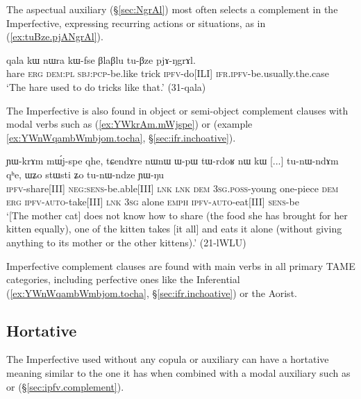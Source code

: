 The aspectual auxiliary  (§\ref{sec:NgrAl}) most often selects a complement in the Imperfective, expressing recurring actions or situations, as in (\ref{ex:tuBze.pjANgrAl}).

\begin{exe}
\ex \label{ex:tuBze.pjANgrAl}
\gll  qala kɯ nɯra kɯ-fse βlaβlu tu-βze pjɤ-ŋgrɤl. \\
hare \textsc{erg} \textsc{dem}:\textsc{pl} \textsc{sbj}:\textsc{pcp}-be.like trick \textsc{ipfv}-do[ILI] \textsc{ifr}.\textsc{ipfv}-be.usually.the.case \\
\glt `The hare used to do tricks like that.' (31-qala)
\end{exe}


The Imperfective is also found in object or semi-object complement clauses with modal verbs such as  (\ref{ex:YWkrAm.mWjspe}) or  (example \ref{ex:YWnWqambWmbjom.tocha}, §\ref{sec:ifr.inchoative}).


\begin{exe}
\ex \label{ex:YWkrAm.mWjspe}
\gll ɲɯ-krɤm mɯ́j-spe qhe, tɕendɤre nɯnɯ ɯ-pɯ tɯ-rdoʁ nɯ kɯ [...] tu-nɯ-ndɤm qʰe, ɯʑo stɯsti ʑo tu-nɯ-ndze ɲɯ-ŋu \\
\textsc{ipfv}-share[III] \textsc{neg}:\textsc{sens}-be.able[III] \textsc{lnk} \textsc{lnk} \textsc{dem} \textsc{3sg}.\textsc{poss}-young one-piece \textsc{dem} \textsc{erg} { } \textsc{ipfv}-\textsc{auto}-take[III] \textsc{lnk} \textsc{3sg} alone \textsc{emph} \textsc{ipfv}-\textsc{auto}-eat[III] \textsc{sens}-be \\
\glt `[The mother cat] does not know how to share (the food she has brought for her kitten equally), one of the kitten takes [it all] and eats it alone (without giving anything to its mother or the other kittens).' (21-lWLU)
\end{exe}

Imperfective complement clauses are found with main verbs in all primary TAME categories, including perfective ones like the Inferential (\ref{ex:YWnWqambWmbjom.tocha}, §\ref{sec:ifr.inchoative}) or the Aorist.


\subsection{Hortative} \label{sec:ipfv.hortative}
The Imperfective used without any copula or auxiliary can have a hortative meaning similar to the one it has when combined with a modal auxiliary such as  or  (§\ref{sec:ipfv.complement}). 

